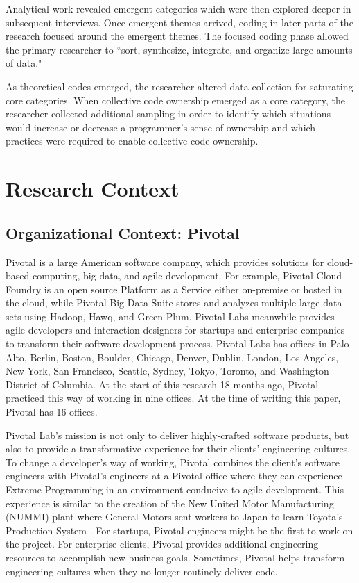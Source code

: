 Analytical work revealed emergent categories which were then explored deeper in subsequent interviews.  Once emergent themes arrived, coding in later parts of the research focused around the emergent themes. The focused coding phase allowed the primary researcher to ``sort, synthesize, integrate, and organize large amounts of data."

As theoretical codes emerged, the researcher altered data collection for saturating core categories. When collective code ownership emerged as a core category, the researcher collected additional sampling in order to identify which situations would increase or decrease a programmer's sense of ownership and which practices were required to enable collective code ownership.

\section{Research Context}
\label{ResearchContext}
\subsection{Organizational Context: Pivotal}
Pivotal is a large American software company, which provides solutions for cloud-based computing, big data, and agile development. For example, Pivotal Cloud Foundry is an open source Platform as a Service either on-premise or hosted in the cloud, while Pivotal Big Data Suite stores and analyzes multiple large data sets using Hadoop, Hawq, and Green Plum. Pivotal Labs meanwhile provides agile developers and interaction designers for startups and enterprise companies to transform their software development process. Pivotal Labs has offices in Palo Alto, Berlin, Boston, Boulder, Chicago, Denver, Dublin, London, Los Angeles, New York, San Francisco, Seattle, Sydney, Tokyo, Toronto, and Washington District of Columbia. At the start of this research 18 months ago, Pivotal practiced this way of working in nine offices. At the time of writing this paper, Pivotal has 16 offices. 

Pivotal Lab's mission is not only to deliver highly-crafted software products, but also to provide a transformative experience for their clients' engineering cultures. To change a developer's way of working, Pivotal combines the client's software engineers with Pivotal's engineers at a Pivotal office where they can experience Extreme Programming in an environment conducive to agile development. This experience is similar to the creation of the New United Motor Manufacturing (NUMMI) plant where General Motors sent workers to Japan to learn Toyota's Production System \cite{Nummi}. For startups, Pivotal engineers might be the first to work on the project. For enterprise clients, Pivotal provides additional engineering resources to accomplish new business goals. Sometimes, Pivotal helps transform engineering cultures when they no longer routinely deliver code.  

